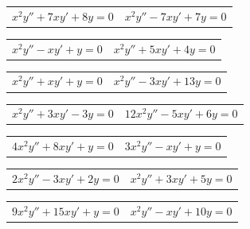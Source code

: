 \begin{exerciselist}
  \begin{tabular}[t]{@{}p{168pt}@{}p{168pt}}
    \item\label{exer:7.4.1} $x^{2}y''+7xy'+8y=0$ & \vspace*{10pt}
    \item\label{exer:7.4.2} $x^{2}y''-7xy'+7y=0$
  \end{tabular}

  \begin{tabular}[t]{@{}p{168pt}@{}p{168pt}}
    \item\label{exer:7.4.3} $x^{2}y''-xy'+y=0$ &
    \item\label{exer:7.4.4} $x^{2}y''+5xy'+4y=0$
  \end{tabular}

  \begin{tabular}[t]{@{}p{168pt}@{}p{168pt}}
    \item\label{exer:7.4.5} $x^{2}y''+xy'+y=0$ &
    \item\label{exer:7.4.6} $x^{2}y''-3xy'+13y=0$
  \end{tabular}

  \begin{tabular}[t]{@{}p{168pt}@{}p{168pt}}
    \item\label{exer:7.4.7} $x^{2}y''+3xy'-3y=0$ &
    \item\label{exer:7.4.8} $12x^{2}y''-5xy'+6y=0$
  \end{tabular}

  \begin{tabular}[t]{@{}p{168pt}@{}p{168pt}}
    \item\label{exer:7.4.9} $4x^{2}y''+8xy'+y=0$ &
    \item\label{exer:7.4.10} $3x^{2}y''-xy'+y=0$
  \end{tabular}

  \begin{tabular}[t]{@{}p{168pt}@{}p{168pt}}
    \item\label{exer:7.4.11} $2x^{2}y''-3xy'+2y=0$ &
    \item\label{exer:7.4.12} $x^{2}y''+3xy'+5y=0$
  \end{tabular}

  \begin{tabular}[t]{@{}p{168pt}@{}p{168pt}}
    \item\label{exer:7.4.13} $9x^{2}y''+15xy'+y=0$ &
    \item\label{exer:7.4.14} $x^{2}y''-xy'+10y=0$
  \end{tabular}


\end{exerciselist}
